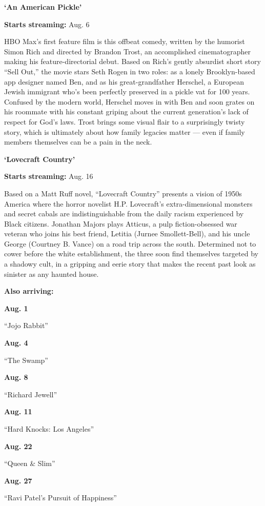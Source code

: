 \textbf{`An American Pickle'}

\textbf{Starts streaming:} Aug. 6

HBO Max's first feature film is this offbeat comedy, written by the
humorist Simon Rich and directed by Brandon Trost, an accomplished
cinematographer making his feature-directorial debut. Based on Rich's
gently absurdist short story ``Sell Out,'' the movie stars Seth Rogen in
two roles: as a lonely Brooklyn-based app designer named Ben, and as his
great-grandfather Herschel, a European Jewish immigrant who's been
perfectly preserved in a pickle vat for 100 years. Confused by the
modern world, Herschel moves in with Ben and soon grates on his roommate
with his constant griping about the current generation's lack of respect
for God's laws. Trost brings some visual flair to a surprisingly twisty
story, which is ultimately about how family legacies matter --- even if
family members themselves can be a pain in the neck.

\textbf{`Lovecraft Country'}

\textbf{Starts streaming:} Aug. 16

Based on a Matt Ruff novel, ``Lovecraft Country'' presents a vision of
1950s America where the horror novelist H.P. Lovecraft's
extra-dimensional monsters and secret cabals are indistinguishable from
the daily racism experienced by Black citizens. Jonathan Majors plays
Atticus, a pulp fiction-obsessed war veteran who joins his best friend,
Letitia (Jurnee Smollett-Bell), and his uncle George (Courtney B. Vance)
on a road trip across the south. Determined not to cower before the
white establishment, the three soon find themselves targeted by a
shadowy cult, in a gripping and eerie story that makes the recent past
look as sinister as any haunted house.

\textbf{Also arriving:}

\textbf{Aug. 1}

``Jojo Rabbit''

\textbf{Aug. 4}

``The Swamp''

\textbf{Aug. 8}

``Richard Jewell''

\textbf{Aug. 11}

``Hard Knocks: Los Angeles''

\textbf{Aug. 22}

``Queen \& Slim''

\textbf{Aug. 27}

``Ravi Patel's Pursuit of Happiness''

